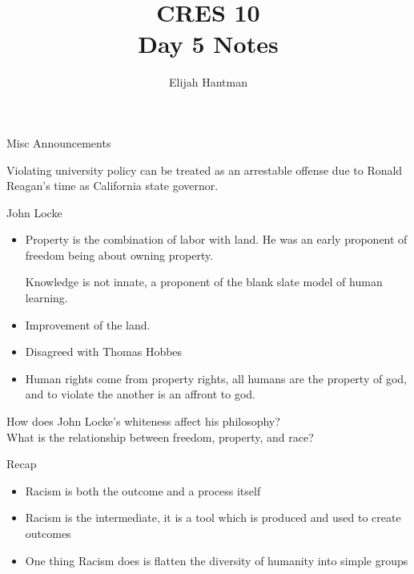 \documentclass{report}
\title{\Huge{CRES 10}\\Day 5 Notes}
\author{\huge{Elijah Hantman}}
\date{}
\begin{document}
\maketitle
\newpage

\begin{description}
    \item {\large Misc Announcements}
        
        Violating university policy can be treated as 
        an arrestable offense due to Ronald Reagan's
        time as California state governor.
    \item {\large John Locke}
        \begin{mdframed}
            \begin{itemize}
                \item
                    Property is the combination of labor
                    with land. He was an early proponent of
                    freedom being about owning property.

                    Knowledge is not innate, a proponent of
                    the blank slate model of human learning.

                \item
                    Improvement of the land.

                \item
                    Disagreed with Thomas Hobbes

                \item 
                    Human rights come from property rights,
                    all humans are the property of god, and
                    to violate the another is an affront to god.
            \end{itemize}

            How does John Locke's whiteness affect his philosophy?\\
            What is the relationship between freedom, property, and race?
        \end{mdframed}
    \item {\large Recap}
        \begin{itemize}
            \item Racism is both the outcome and a process itself
            \item Racism is the intermediate, it is a tool which is produced
                and used to create outcomes

            \item One thing Racism does is flatten the diversity of humanity
                into simple groups


\end{itemize}
\end{description}
\end{document}
